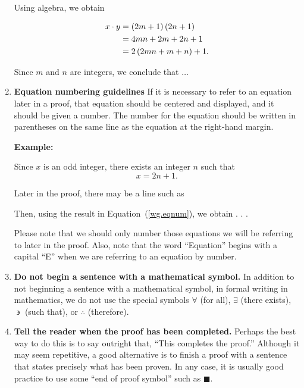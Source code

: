 \begin{enumerate}
Using algebra, we obtain
	
\begin{align}
  x \cdot y &= \left( {2m + 1} \right)\left( {2n + 1} \right)  \notag \\ 
            &= 4mn + 2m + 2n + 1  \notag \\ 
            &= 2\left( {2mn + m + n} \right) + 1 . \notag  
\end{align} 


Since  $m$  and  $n$  are integers, we conclude that $ \ldots $

\item \textbf{Equation numbering guidelines}
If it is necessary to refer to an equation later in a proof, that equation should be centered and displayed, and it should be given a number.  The number for the equation should be written in parentheses on the same line as the equation at the right-hand margin.

\textbf{Example:}
\setcounter{equation}{0}

Since  $x$  is an odd integer, there exists an integer  $n$  such that
\begin{equation} \label{wg.eqnum}
x = 2n + 1.
\end{equation}

\begin{flushleft}
Later in the proof, there may be a line such as
\begin{center}
Then, using the result in Equation~(\ref{wg.eqnum}), we obtain  . . .
\end{center}
Please note that we should only number those equations we will be referring to later in the proof.  Also, note that the word ``Equation'' begins with a capital ``E'' when we are referring to an equation by number.
\end{flushleft}

\item \textbf{Do not begin a sentence with a mathematical symbol.}
In addition to not beginning a sentence with a mathematical symbol, in formal writing in mathematics, we do not use the special symbols $\forall $ (for all), $\exists $ (there exists), 
$\mathrel\backepsilon  $ (such that), or $\therefore $ (therefore).

\item \textbf{Tell the reader when the proof has been completed.}
Perhaps the best way to do this is to say outright that, ``This completes the proof.''  Although it may seem repetitive, a good alternative is to finish a proof with a sentence that states precisely what has been proven.  In any case, it is usually good practice to use  some ``end of proof symbol'' such as  $\blacksquare$.


\end{enumerate}
